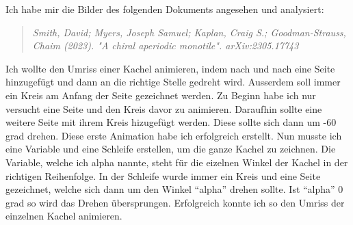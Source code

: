 \documentclass[a4paper]{article} %
\begin{document}
    Ich habe mir die Bilder des folgenden Dokuments angesehen und analysiert:

    \begin{quote}
        \textsl{Smith, David; Myers, Joseph Samuel; Kaplan, Craig S.; Goodman-Strauss, Chaim (2023). "A chiral aperiodic monotile". arXiv:2305.17743}
    \end{quote}

    Ich wollte den Umriss einer Kachel animieren, indem nach und nach 
    eine Seite hinzugefügt und dann an die richtige Stelle gedreht wird.
    Ausserdem soll immer ein Kreis am Anfang der Seite gezeichnet werden.
    Zu Beginn habe ich nur versucht eine Seite und den Kreis davor zu animieren.
    Daraufhin sollte eine weitere Seite mit ihrem Kreis hizugefügt werden.
    Diese sollte sich dann um -60 grad drehen.
    Diese erste Animation habe ich erfolgreich erstellt.
    Nun musste ich eine Variable und eine Schleife erstellen,
    um die ganze Kachel zu zeichnen.
    Die Variable, welche ich alpha nannte, steht für 
    die eizelnen Winkel der Kachel in der richtigen Reihenfolge.
    In der Schleife wurde immer ein Kreis und eine Seite gezeichnet,
    welche sich dann um den Winkel ``alpha'' drehen sollte.
    Ist ``alpha'' 0 grad so wird das Drehen übersprungen.
    Erfolgreich konnte ich so den Umriss der einzelnen Kachel animieren.
    
\end{document}
